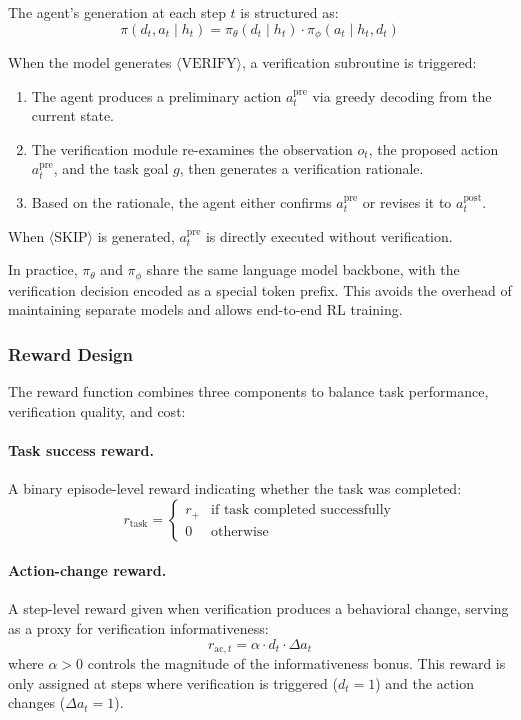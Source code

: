 The agent's generation at each step $t$ is structured as:
\begin{equation}
\pi(d_t, a_t \mid h_t) = \pi_\theta(d_t \mid h_t) \cdot \pi_\phi(a_t \mid h_t, d_t)
\label{eq:policy-factorization}
\end{equation}

When the model generates $\langle\text{VERIFY}\rangle$, a verification subroutine is triggered:
\begin{enumerate}
    \item The agent produces a preliminary action $a_t^{\text{pre}}$ via greedy decoding from the current state.
    \item The verification module re-examines the observation $o_t$, the proposed action $a_t^{\text{pre}}$, and the task goal $g$, then generates a verification rationale.
    \item Based on the rationale, the agent either confirms $a_t^{\text{pre}}$ or revises it to $a_t^{\text{post}}$.
\end{enumerate}

When $\langle\text{SKIP}\rangle$ is generated, $a_t^{\text{pre}}$ is directly executed without verification.

In practice, $\pi_\theta$ and $\pi_\phi$ share the same language model backbone, with the verification decision encoded as a special token prefix. This avoids the overhead of maintaining separate models and allows end-to-end RL training.

\subsubsection{Reward Design}

The reward function combines three components to balance task performance, verification quality, and cost:

\paragraph{Task success reward.} A binary episode-level reward indicating whether the task was completed:
\begin{equation}
r_{\text{task}} = \begin{cases} r_+ & \text{if task completed successfully} \\ 0 & \text{otherwise} \end{cases}
\label{eq:task-reward}
\end{equation}

\paragraph{Action-change reward.} A step-level reward given when verification produces a behavioral change, serving as a proxy for verification informativeness:
\begin{equation}
r_{\text{ac}, t} = \alpha \cdot d_t \cdot \Delta a_t
\label{eq:ac-reward}
\end{equation}
where $\alpha > 0$ controls the magnitude of the informativeness bonus. This reward is only assigned at steps where verification is triggered ($d_t = 1$) and the action changes ($\Delta a_t = 1$).

